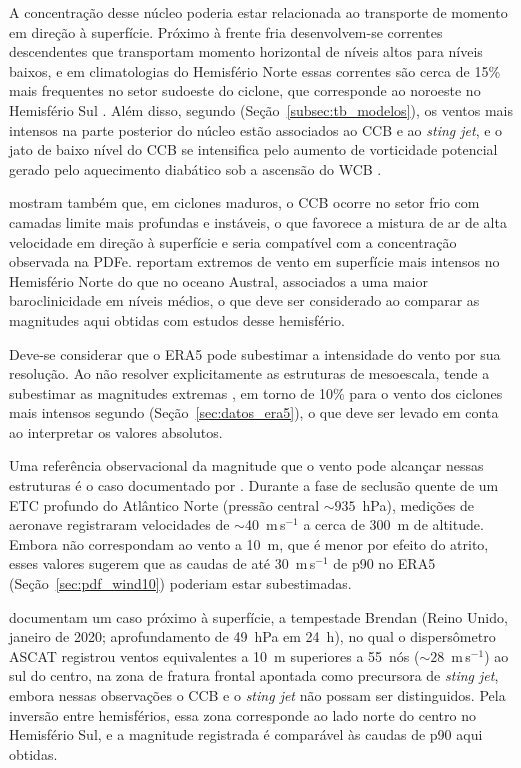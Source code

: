 A concentração desse núcleo poderia estar relacionada ao transporte de momento em direção à superfície. Próximo à frente fria desenvolvem-se correntes descendentes que transportam momento horizontal de níveis altos para níveis baixos, e em climatologias do Hemisfério Norte essas correntes são cerca de 15\% mais frequentes no setor sudoeste do ciclone, que corresponde ao noroeste no Hemisfério Sul \citep{hyeok2024extrem}. Além disso, segundo \citet{martinez2014cold} (Seção~\ref{subsec:tb_modelos}), os ventos mais intensos na parte posterior do núcleo estão associados ao CCB e ao \textit{sting jet}, e o jato de baixo nível do CCB se intensifica pelo aumento de vorticidade potencial gerado pelo aquecimento diabático sob a ascensão do WCB \citep{schemm2014linkage}.

\citet{gentile2023observed} mostram também que, em ciclones maduros, o CCB ocorre no setor frio com camadas limite mais profundas e instáveis, o que favorece a mistura de ar de alta velocidade em direção à superfície e seria compatível com a concentração observada na PDFe. \citet{stankovic2025surface} reportam extremos de vento em superfície mais intensos no Hemisfério Norte do que no oceano Austral, associados a uma maior baroclinicidade em níveis médios, o que deve ser considerado ao comparar as magnitudes aqui obtidas com estudos desse hemisfério.

Deve-se considerar que o ERA5 pode subestimar a intensidade do vento por sua resolução. Ao não resolver explicitamente as estruturas de mesoescala, tende a subestimar as magnitudes extremas \citep{hodges2011comparison}, em torno de 10\% para o vento dos ciclones mais intensos segundo \citet{chen2024evaluation} (Seção~\ref{sec:datos_era5}), o que deve ser levado em conta ao interpretar os valores absolutos.

Uma referência observacional da magnitude que o vento pode alcançar nessas estruturas é o caso documentado por \citet{shapiro1990life}. Durante a fase de seclusão quente de um ETC profundo do Atlântico Norte (pressão central ${\sim}935$~hPa), medições de aeronave registraram velocidades de ${\sim}$40~m\,s$^{-1}$ a cerca de 300~m de altitude. Embora não correspondam ao vento a 10~m, que é menor por efeito do atrito, esses valores sugerem que as caudas de até 30~m\,s$^{-1}$ de p90 no ERA5 (Seção~\ref{sec:pdf_wind10}) poderiam estar subestimadas.

\citet{gray2020prototype} documentam um caso próximo à superfície, a tempestade Brendan (Reino Unido, janeiro de 2020; aprofundamento de 49~hPa em 24~h), no qual o dispersômetro ASCAT registrou ventos equivalentes a 10~m superiores a 55~nós (${\sim}28$~m\,s$^{-1}$) ao sul do centro, na zona de fratura frontal apontada como precursora de \textit{sting jet}, embora nessas observações o CCB e o \textit{sting jet} não possam ser distinguidos. Pela inversão entre hemisférios, essa zona corresponde ao lado norte do centro no Hemisfério Sul, e a magnitude registrada é comparável às caudas de p90 aqui obtidas.

